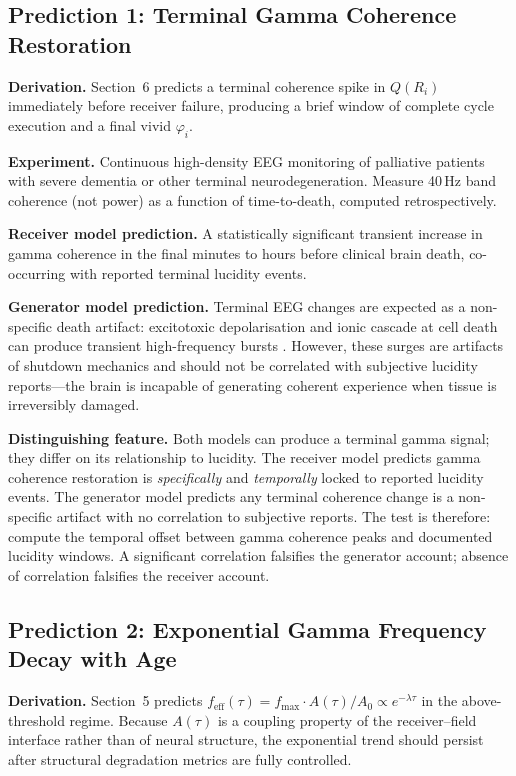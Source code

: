 \documentclass[12pt]{article}
\begin{document}
\subsection{Prediction 1: Terminal Gamma Coherence Restoration}

\textbf{Derivation.} Section~6 predicts a terminal coherence spike in $Q(R_i)$ immediately before receiver failure, producing a brief window of complete cycle execution and a final vivid $\varphi_i$.

\textbf{Experiment.} Continuous high-density EEG monitoring of palliative patients with severe dementia or other terminal neurodegeneration. Measure 40\,Hz band coherence (not power) as a function of time-to-death, computed retrospectively.

\textbf{Receiver model prediction.} A statistically significant transient increase in gamma coherence in the final minutes to hours before clinical brain death, co-occurring with reported terminal lucidity events.

\textbf{Generator model prediction.} Terminal EEG changes are expected as a non-specific death artifact: excitotoxic depolarisation and ionic cascade at cell death can produce transient high-frequency bursts \cite{borjigin2023}. However, these surges are artifacts of shutdown mechanics and should not be correlated with subjective lucidity reports---the brain is incapable of generating coherent experience when tissue is irreversibly damaged.

\textbf{Distinguishing feature.} Both models can produce a terminal gamma signal; they differ on its relationship to lucidity. The receiver model predicts gamma coherence restoration is \textit{specifically} and \textit{temporally} locked to reported lucidity events. The generator model predicts any terminal coherence change is a non-specific artifact with no correlation to subjective reports. The test is therefore: compute the temporal offset between gamma coherence peaks and documented lucidity windows. A significant correlation falsifies the generator account; absence of correlation falsifies the receiver account.

\subsection{Prediction 2: Exponential Gamma Frequency Decay with Age}

\textbf{Derivation.} Section~5 predicts $f_{\mathrm{eff}}(\tau) = f_{\max}\cdot A(\tau)/A_0 \propto e^{-\lambda\tau}$ in the above-threshold regime. Because $A(\tau)$ is a coupling property of the receiver--field interface rather than of neural structure, the exponential trend should persist after structural degradation metrics are fully controlled.
\end{document}
